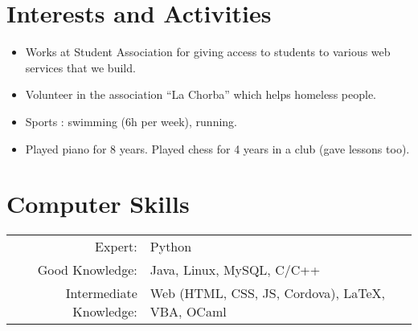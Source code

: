 \documentclass[a4paper,10pt]{article} %
\begin{document}

\section{Interests and Activities}

\begin{itemize}[noitemsep]
  \item Works at Student Association for giving access to students to various web services that we build.
  \item Volunteer in the association ``La Chorba'' which helps homeless people.
  \item Sports : swimming (6h per week), running.
  \item Played piano for 8 years. Played chess for 4 years in a club (gave lessons too).
\end{itemize}



\section{Computer Skills}

\begin{tabular}{rl}
  Expert: & Python\\
  Good Knowledge: & Java, Linux, MySQL, C/C++\\
  Intermediate Knowledge: & Web (HTML, CSS, JS, Cordova), \LaTeX, VBA, OCaml
\end{tabular}
\end{document}
